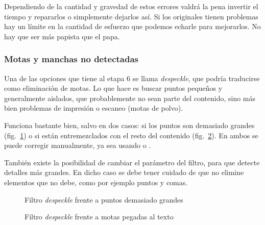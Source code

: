 \documentclass[%
	a5paper,
	10pt,
	twoside,
	openright,
	final,
]{memoir}
\begin{document}
	Dependiendo de la cantidad y gravedad de estos errores valdrá la pena invertir el tiempo y repararlos o simplemente dejarlos así. %
	Si los originales tienen problemas hay un límite en la cantidad de esfuerzo que podemos echarle para mejorarlos. No hay que ser más papista que el papa. %

	\subsubsection{Motas y manchas no detectadas} Una de las opciones que tiene al etapa 6 se llama \emph{despeckle}, que podría traducirse como eliminación de motas. Lo que hace es buscar puntos pequeños y generalmente aislados, que probablemente no sean parte del contenido, sino más bien problemas de impresión o escaneo (motas de polvo).

	Funciona bastante bien, salvo en dos casos: si los puntos son demasiado grandes (fig.~\ref{fig:SToutputDespeckleSpot}) o si están entremezclados con el resto del contenido (fig.~\ref{fig:SToutputDespeckleSpeckle}). En ambos se puede corregir manualmente, ya sea usando \gimp o .

	También existe la posibilidad de cambiar el parámetro del filtro, para que detecte detalles más grandes. En dicho caso se debe tener cuidado de que no elimine elementos que no debe, como por ejemplo puntos y comas.

	\begin{figure}
		\hfill
		\caption{Filtro \emph{despeckle} frente a puntos demasiado grandes\label{fig:SToutputDespeckleSpot}}
	\end{figure}

	\begin{figure}
		\hfill
		\caption{Filtro \emph{despeckle} frente a motas pegadas al texto\label{fig:SToutputDespeckleSpeckle}}
	\end{figure}
\end{document}

